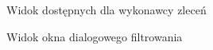 \begin{figure}[ht]
\begin{subfigure}[t]{0.32\textwidth}
    \caption{Widok dostępnych dla wykonawcy zleceń}
  \end{subfigure}
  \begin{subfigure}[t]{0.32\textwidth}
    \centering
    \caption{Widok okna dialogowego filtrowania}
  \end{subfigure}
  \begin{subfigure}[t]{0.32\textwidth}

\end{subfigure}
\end{figure}
